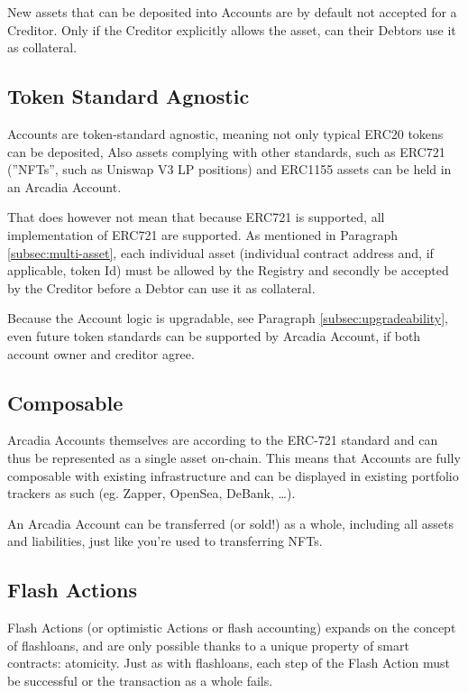 \documentclass[sigconf,nonacm]{acmart}
\begin{document}
New assets that can be deposited into Accounts are by default not accepted for a Creditor.
Only if the Creditor explicitly allows the asset, can their Debtors use it as collateral.

\subsection{Token Standard Agnostic}
Accounts are token-standard agnostic, meaning not only typical ERC20 tokens can be deposited,
Also assets complying with other standards, such as ERC721 (”NFTs”, such as Uniswap V3 LP positions) and ERC1155 assets can be held in an Arcadia Account.

That does however not mean that because ERC721 is supported, all implementation of ERC721 are supported.
As mentioned in Paragraph \ref{subsec:multi-asset}, each individual asset (individual contract address and, if applicable, token Id)
must be allowed by the Registry and secondly be accepted by the Creditor before a Debtor can use it as collateral.

Because the Account logic is upgradable, see Paragraph \ref{subsec:upgradeability}, even future token standards can be supported by Arcadia Account,
if both account owner and creditor agree.

\subsection{Composable}
Arcadia Accounts themselves are according to the ERC-721 standard and can thus be represented as a single asset on-chain.
This means that Accounts are fully composable with existing infrastructure and can be displayed in existing portfolio trackers as such (eg. Zapper, OpenSea, DeBank, …).

An Arcadia Account can be transferred (or sold!) as a whole, including all assets and liabilities, just like you're used to transferring NFTs.

\subsection{Flash Actions}
Flash Actions (or optimistic Actions or flash accounting) expands on the concept of flashloans, and are only possible thanks to a unique property of smart contracts: atomicity\cite{xie2022towards}.
Just as with flashloans, each step of the Flash Action must be successful or the transaction as a whole fails.
\end{document}

